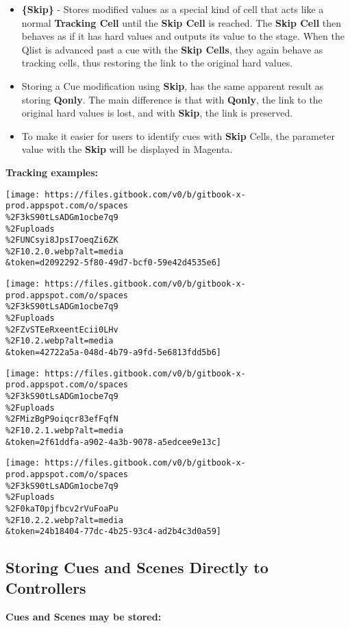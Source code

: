 \documentclass[
]{article}
\begin{document}
\begin{itemize}
\item
  \textbf{\{Skip\}} - Stores modified values as a special kind of cell that acts like a normal \textbf{Tracking Cell} until the \textbf{Skip Cell} is reached. The \textbf{Skip Cell} then behaves as if it has hard values and outputs its value to the stage. When the Qlist is advanced past a cue with the \textbf{Skip Cells}, they again behave as tracking cells, thus restoring the link to the original hard values.
\item
  Storing a Cue modification using \textbf{Skip}, has the same apparent result as storing \textbf{Qonly}. The main difference is that with \textbf{Qonly}, the link to the original hard values is lost, and with \textbf{Skip}, the link is preserved.
\item
  To make it easier for users to identify cues with \textbf{Skip} Cells, the parameter value with the \textbf{Skip} will be displayed in {Magenta}.
\end{itemize}

\textbf{Tracking examples:}

\texttt{[image: https://files.gitbook.com/v0/b/gitbook-x-prod.appspot.com/o/spaces\\\%2F3kS90tLsADGm1ocbe7q9\\\%2Fuploads\\\%2FUNCsyi8JpsI7oeqZi6ZK\\\%2F10.2.0.webp?alt=media\\\&token=d2092292-5f80-49d7-bcf0-59e42d4535e6]}

\texttt{[image: https://files.gitbook.com/v0/b/gitbook-x-prod.appspot.com/o/spaces\\\%2F3kS90tLsADGm1ocbe7q9\\\%2Fuploads\\\%2FZvSTEeRxeentEcii0LHv\\\%2F10.2.webp?alt=media\\\&token=42722a5a-048d-4b79-a9fd-5e6813fdd5b6]}

\texttt{[image: https://files.gitbook.com/v0/b/gitbook-x-prod.appspot.com/o/spaces\\\%2F3kS90tLsADGm1ocbe7q9\\\%2Fuploads\\\%2FMizBgP9oiqcr83efFqfN\\\%2F10.2.1.webp?alt=media\\\&token=2f61ddfa-a902-4a3b-9078-a5edcee9e13c]}

\texttt{[image: https://files.gitbook.com/v0/b/gitbook-x-prod.appspot.com/o/spaces\\\%2F3kS90tLsADGm1ocbe7q9\\\%2Fuploads\\\%2F0kaT0pjfbcv2rVuFoaPu\\\%2F10.2.2.webp?alt=media\\\&token=24b18404-77dc-4b25-93c4-ad2b4c3d0a59]}

\hypertarget{storing-cues-and-scenes-directly-to-controllers}{%
\subsection{Storing Cues and Scenes Directly to Controllers}\label{storing-cues-and-scenes-directly-to-controllers}}

\textbf{Cues and Scenes may be stored:}
\end{document}
